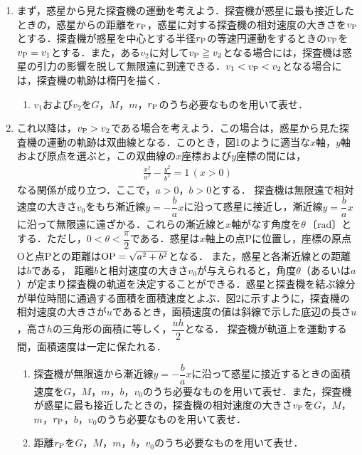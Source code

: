 \begin{enumerate}[I]
  \item {\hzw}まず，惑星から見た探査機の運動を考えよう．探査機が惑星に最も接近したときの，惑星からの距離を$r_\mathrm{P}$，惑星に対する探査機の相対速度の大きさを$v_\mathrm{P}$とする．探査機が惑星を中心とする半径$r_\mathrm{P}$の等速円運動をするときの$v_\mathrm{P}$を$v_\mathrm{P} = v_1$とする．また，ある$v_2$に対して$v_\mathrm{P} \geqq v_2$となる場合には，探査機は惑星の引力の影響を脱して無限遠に到達できる．$v_1 < v_\mathrm{P} < v_2$となる場合には，探査機の軌跡は楕円を描く．
  \begin{enumerate}[(1)]
    \item {\hzw}$v_1$および$v_2$を$G$，$M$，$m$，$r_\mathrm{P}$のうち必要なものを用いて表せ．
  \end{enumerate}
  \item {\hzw}これ以降は，$v_\mathrm{P} > v_2$である場合を考えよう．この場合は，惑星から見た探査機の運動の軌跡は双曲線となる．このとき，図1のように適当な$x$軸，$y$軸および原点を選ぶと，この双曲線の$x$座標および$y$座標の間には，
  \begin{gather*}
    \frac{x^2}{a^2} - \frac{y^2}{b^2} = 1 \, (x > 0)
  \end{gather*}
  なる関係が成り立つ．ここで，$a > 0$，$b > 0$とする．
  探査機は無限遠で相対速度の大きさ$v_0$をもち漸近線$y = -\dfrac{b}{a}x$に沿って惑星に接近し，漸近線$y = \dfrac{b}{a}x$に沿って無限遠に遠ざかる．これらの漸近線と$x$軸がなす角度を$\theta\, \text{〔rad〕}$とする．ただし，$0 < \theta <\dfrac{\pi}{2}$である．惑星は$x$軸上の点Pに位置し，座標の原点Oと点Pとの距離は$\mathrm{OP} = \sqrt{a^2 + b^2}$となる．
  また，惑星と各漸近線との距離は$b$である，
  距離$b$と相対速度の大きさ$v_0$が与えられると，角度$\theta$（あるいは$a$）が定まり探査機の軌道を決定することができる．惑星と探査機を結ぶ線分が単位時間に通過する面積を面積速度とよぶ．図2に示すように，探査機の相対速度の大きさが$u$であるとき，面積速度の値は斜線で示した底辺の長さ$u$，高さ$h$の三角形の面積に等しく，$\dfrac{uh}{2}$となる．
  探査機が軌道上を運動する間，面積速度は一定に保たれる．
  \begin{enumerate}[(1), resume]
    \item {\hzw}探査機が無限遠から漸近線$y = -\dfrac{b}{a}x$に沿って惑星に接近するときの面積速度を$G$，$M$，$m$，$b$，$v_0$のうち必要なものを用いて表せ．また，探査機が惑星に最も接近したときの，探査機の相対速度の大きさ$v_\mathrm{P}$を$G$，$M$，$m$，$r_\mathrm{P}$，$b$，$v_0$のうち必要なものを用いて表せ．
    \item {\hzw}距離$r_\mathrm{P}$を$G$，$M$，$m$，$b$，$v_0$のうち必要なものを用いて表せ．

\end{enumerate}
\end{enumerate}
